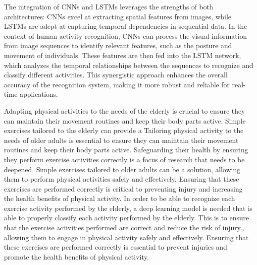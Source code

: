 The integration of CNNs and LSTMs leverages the strengths of both architectures: CNNs excel at extracting spatial features from images, while LSTMs are adept at capturing temporal dependencies in sequential data. In the context of human activity recognition, CNNs can process the visual information from image sequences to identify relevant features, such as the posture and movement of individuals. These features are then fed into the LSTM network, which analyzes the temporal relationships between the sequences to recognize and classify different activities. This synergistic approach enhances the overall accuracy of the recognition system, making it more robust and reliable for real-time applications.

Adapting physical activities to the needs of the elderly is crucial to ensure they can maintain their movement routines and keep their body parts active. Simple exercises tailored to the elderly can provide a Tailoring physical activity to the needs of older adults is essential to ensure they can maintain their movement routines and keep their body parts active. Safeguarding their health by ensuring they perform exercise activities correctly is a focus of research that needs to be deepened. Simple exercises tailored to older adults can be a solution, allowing them to perform physical activities safely and effectively. Ensuring that these exercises are performed correctly is critical to preventing injury and increasing the health benefits of physical activity. In order to be able to recognize each exercise activity performed by the elderly, a deep learning model is needed that is able to properly classify each activity performed by the elderly. This is to ensure that the exercise activities performed are correct and reduce the risk of injury., allowing them to engage in physical activity safely and effectively. Ensuring that these exercises are performed correctly is essential to prevent injuries and promote the health benefits of physical activity.


